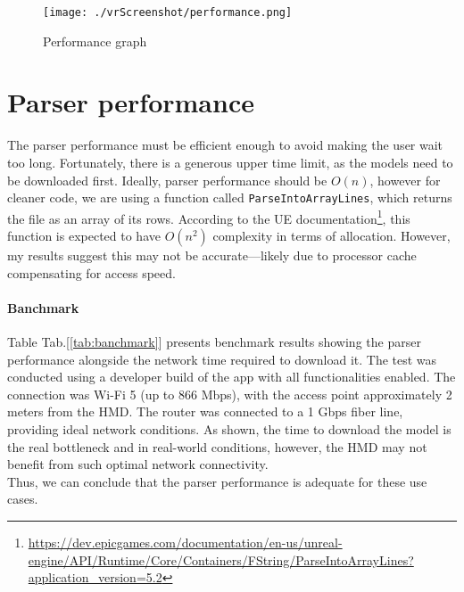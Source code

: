 \begin{figure}[ht]
  \centering
  \texttt{[image: ./vrScreenshot/performance.png]}
  \caption{Performance graph}
  \label{fig:performance}
\end{figure}

\section{Parser performance}\noindent
The parser performance must be efficient enough to avoid making the user wait too long. Fortunately, there is a generous upper time limit, as the models need to be downloaded first.
Ideally, parser performance should be $O(n)$, however for cleaner code, we are using a function called \texttt{ParseIntoArrayLines}, which returns the file as an array of its rows.
According to the \ac{UE} documentation\footnote{\url{https://dev.epicgames.com/documentation/en-us/unreal-engine/API/Runtime/Core/Containers/FString/ParseIntoArrayLines?application_version=5.2}}, this function is expected to have $O(n^2)$ complexity in terms of allocation.
However, my results suggest this may not be accurate—likely due to processor cache compensating for access speed.

\paragraph{Banchmark}
Table Tab.[\ref{tab:banchmark}] presents benchmark results showing the parser performance alongside the network time required to download it.
The test was conducted using a developer build of the app with all functionalities enabled. The connection was Wi-Fi 5 (up to 866 Mbps), with the access point approximately 2 meters from the \ac{HMD}.
The router was connected to a 1 Gbps fiber line, providing ideal network conditions.
As shown, the time to download the model is the real bottleneck and in real-world conditions, however, the \ac{HMD} may not benefit from such optimal network connectivity.\\
Thus, we can conclude that the parser performance is adequate for these use cases.


